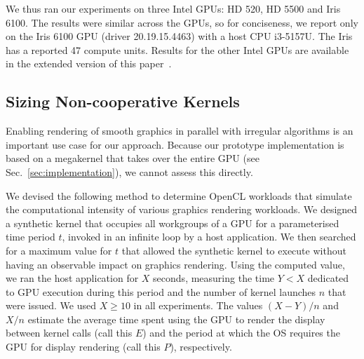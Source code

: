 \documentclass[sigconf]{acmart}
\newcommand{\TSAdded}[1]{#1}
\newcommand{\mysec}{Sec.~}
\begin{document}
{%
%
%
\TSAdded{We thus ran our experiments on three Intel GPUs: HD 520, HD 5500
and Iris 6100. The results were similar across the GPUs, so for
conciseness, we report only on the Iris 6100 GPU (driver
20.19.15.4463) with a host CPU i3-5157U. The Iris has a reported 47
compute units. Results for the other Intel GPUs are available in
the extended version of this paper~\cite{ExtendedVersion}.}


\subsection{Sizing Non-cooperative Kernels}\label{sec:sizingnoncoop}

Enabling rendering of smooth graphics in parallel with irregular
algorithms is an important use case for our approach.  Because our
prototype implementation is based on a megakernel that takes over the
entire GPU (see \mysec\ref{sec:implementation}), we cannot assess this
directly.

We devised the following method to determine OpenCL workloads that simulate
the computational intensity of various graphics rendering workloads.
%
We designed a synthetic kernel that occupies all workgroups of a GPU
for a parameterised time period $t$, invoked in an infinite loop by a
host application.  We then searched for a maximum value for $t$ that
allowed the synthetic kernel to execute without having an observable
impact on graphics rendering.  Using the computed value, we ran the
host application for $X$ seconds, measuring the time $Y < X$ dedicated
to GPU execution during this period and the number of kernel launches
$n$ that were issued.  We used $X \geq 10$ in all experiments.  The
values $(X-Y)/n$ and $X/n$ estimate the average time spent using the
GPU to render the display between kernel calls (call this $E$) and the
period at which the OS requires the GPU for display rendering (call
this $P$), respectively.

}
\end{document}
